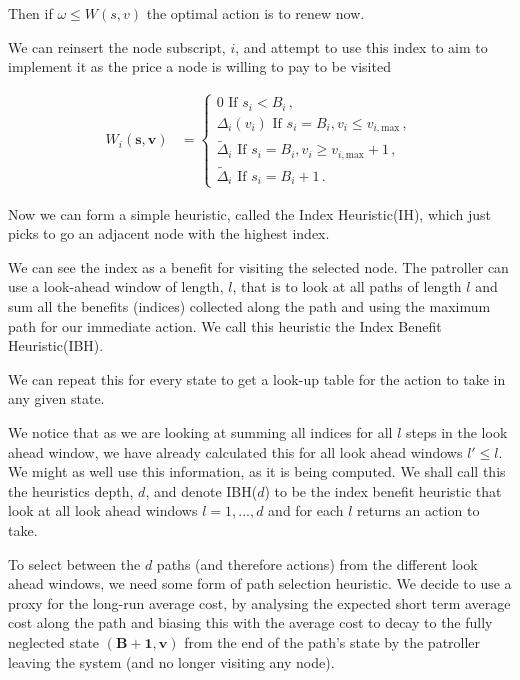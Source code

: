 \documentclass[a4paper,10pt]{article}
\theoremstyle{definition}
\theoremstyle{definition}
\theoremstyle{remark}
\theoremstyle{definition}
\begin{document}
Then if $\omega \leq W(s,v)$ the optimal action is to renew now.

We can reinsert the node subscript, $i$, and attempt to use this index to aim to implement it as the price a node is willing to pay to be visited

\begin{align*}
W_{i}(\bm{s},\bm{v})&=\begin{cases}
0 \text{ If } s_{i}<B_{i} \, , \\
\Delta_{i}(v_{i}) \text{ If } s_{i}=B_{i} , v_{i} \leq v_{i,\text{max}} \, , \\
\widetilde{\Delta}_{i} \text{ If } s_{i}=B_{i} , v_{i} \geq v_{i,\text{max}}+1 \, , \\
\widetilde{\Delta}_{i} \text{ If } s_{i}=B_{i}+1 \, .
\end{cases}
\end{align*}

Now we can form a simple heuristic, called the Index Heuristic(IH), which just picks to go an adjacent node with the highest index.

We can see the index as a benefit for visiting the selected node. The patroller can use a look-ahead window of length, $l$, that is to look at all paths of length $l$ and sum all the benefits (indices) collected along the path and using the maximum path for our immediate action. We call this heuristic the Index Benefit Heuristic(IBH).

We can repeat this for every state to get a look-up table for the action to take in any given state.

We notice that as we are looking at summing all indices for all $l$ steps in the look ahead window, we have already calculated this for all look ahead windows $l' \leq l$. We might as well use this information, as it is being computed. We shall call this the heuristics depth, $d$, and denote IBH($d$) to be the index benefit heuristic that look at all look ahead windows $l=1,...,d$ and for each $l$ returns an action to take.

To select between the $d$ paths (and therefore actions) from the different look ahead windows, we need some form of path selection heuristic. We decide to use a proxy for the long-run average cost, by analysing the expected short term average cost along the path and biasing this with the average cost to decay to the fully neglected state $(\bm{B}+\bm{1},\bm{v})$ from the end of the path's state by the patroller leaving the system (and no longer visiting any node).
\end{document}
